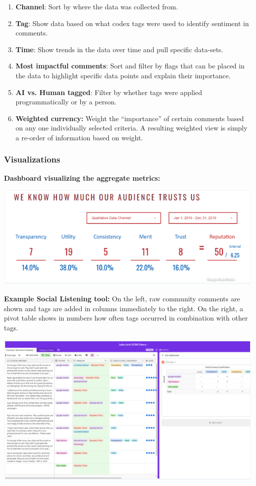 \begin{enumerate}
\def\labelenumi{\arabic{enumi}.}
\tightlist
\item
  \textbf{Channel}: Sort by where the data was collected from.
\item
  \textbf{Tag}: Show data based on what codex tags were used to identify
  sentiment in comments.
\item
  \textbf{Time}: Show trends in the data over time and pull specific
  data-sets.
\item
  \textbf{Most impactful comments}: Sort and filter by flags that can be
  placed in the data to highlight specific data points and explain their
  importance.
\item
  \textbf{AI vs. Human tagged}: Filter by whether tags were applied
  programmatically or by a person.
\item
  \textbf{Weighted currency:} Weight the ``importance'' of certain
  comments based on any one individually selected criteria. A resulting
  weighted view is simply a re-order of information based on weight.
\end{enumerate}

\hypertarget{visualizations}{%
\subsubsection{Visualizations}\label{visualizations}}

\textbf{Dashboard visualizing the aggregate metrics:}

\includegraphics{images/social-listening_dashboard.png}

\textbf{Example Social Listening tool:} On the left, raw community
comments are shown and tags are added in columns immediately to the
right. On the right, a pivot table shows in numbers how often tags
occurred in combination with other tags.

\includegraphics{images/social-listening_tool-example.png}

